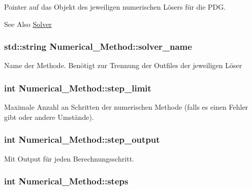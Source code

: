 Pointer auf das Objekt des jeweiligen numerischen Lösers für die P\-D\-G. \begin{DoxySeeAlso}{See Also}
\hyperlink{classSolver}{Solver} 
\end{DoxySeeAlso}
\hypertarget{classNumerical__Method_a4292dc8b238e8377cf35df477628f45f}{
\subsubsection[{solver\-\_\-name}]{\setlength{\rightskip}{0pt plus 5cm}std\-::string Numerical\-\_\-\-Method\-::solver\-\_\-name}}\label{classNumerical__Method_a4292dc8b238e8377cf35df477628f45f}
Name der Methode. Benötigt zur Trennung der Outfiles der jeweiligen Löser \hypertarget{classNumerical__Method_a21a906effd1727e5c82b884712ef8ef4}{
\subsubsection[{step\-\_\-limit}]{\setlength{\rightskip}{0pt plus 5cm}int Numerical\-\_\-\-Method\-::step\-\_\-limit}}\label{classNumerical__Method_a21a906effd1727e5c82b884712ef8ef4}
Maximale Anzahl an Schritten der numerischen Methode (falls es einen Fehler gibt oder andere Umstände). \hypertarget{classNumerical__Method_acc1d72ff59613cb41b3fb4b4bd47f176}{
\subsubsection[{step\-\_\-output}]{\setlength{\rightskip}{0pt plus 5cm}int Numerical\-\_\-\-Method\-::step\-\_\-output}}\label{classNumerical__Method_acc1d72ff59613cb41b3fb4b4bd47f176}
Mit Output für jeden Berechnungsschritt. \hypertarget{classNumerical__Method_ad61abc8035cbd22e32903af1282cb610}{
\subsubsection[{steps}]{\setlength{\rightskip}{0pt plus 5cm}int Numerical\-\_\-\-Method\-::steps}}\label{classNumerical__Method_ad61abc8035cbd22e32903af1282cb610}
